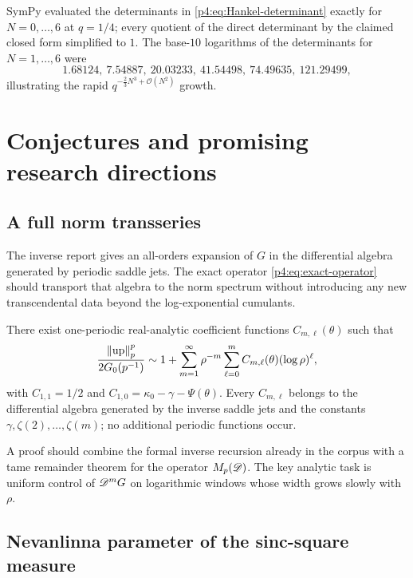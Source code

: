 \documentclass[11pt,oneside]{article}
\theoremstyle{definition}
\theoremstyle{remark}
\newcommand{\Up}{\operatorname{up}}
\newcommand{\bigO}{\mathcal O}
\begin{document}
SymPy evaluated the determinants in \eqref{p4:eq:Hankel-determinant} exactly for
$N=0,\ldots,6$ at $q=1/4$; every quotient of the direct determinant by the claimed closed
form simplified to $1$.  The base-$10$ logarithms of the determinants for $N=1,\ldots,6$
were
\[
 1.68124,\ 7.54887,\ 20.03233,\ 41.54498,\ 74.49635,\ 121.29499,
\]
illustrating the rapid $q^{-\frac23N^3+\bigO(N^2)}$ growth.

\section{Conjectures and promising research directions}
\label{p4:sec:future}

\subsection{A full norm transseries}

The inverse report gives an all-orders expansion of $G$ in the differential algebra generated
by periodic saddle jets.  The exact operator \eqref{p4:eq:exact-operator} should transport that
algebra to the norm spectrum without introducing any new transcendental data beyond the
log-exponential cumulants.

\begin{conjecture}
\label{p4:conj:full-norm-transseries}
There exist one-periodic real-analytic coefficient functions
$C_{m,\ell}(\theta)$ such that
\begin{equation}
 \frac{\norm{\Up}_p^p}{2G_0(p^{-1})}
 \sim1+\sum_{m=1}^{\infty}\rho^{-m}
 \sum_{\ell=0}^{m}C_{m,\ell}(\theta)(\log\rho)^\ell,
 \label{p4:eq:full-norm-transseries}
\end{equation}
with $C_{1,1}=1/2$ and
$C_{1,0}=\kappa_0-\gamma-\Psi(\theta)$.  Every $C_{m,\ell}$ belongs to the differential
algebra generated by the inverse saddle jets and the constants
$\gamma,\zeta(2),\ldots,\zeta(m)$; no additional periodic functions occur.
\end{conjecture}

A proof should combine the formal inverse recursion already in the corpus with a tame
remainder theorem for the operator $M_p(\mathscr D)$.  The key analytic task is uniform control of
$\mathscr D^mG$ on logarithmic windows whose width grows slowly with $\rho$.

\subsection{Nevanlinna parameter of the sinc-square measure}
\end{document}
